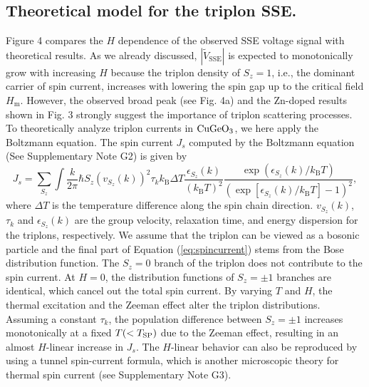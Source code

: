 \documentclass{nature}
\begin{document}
\subsection{Theoretical model for the triplon SSE.}  
Figure 4 compares the $H$ dependence of the observed SSE voltage signal with  theoretical results. 
As we already discussed, $|\tilde{V}_{\mathrm{SSE}}|$ is expected to monotonically grow with increasing $H$ 
because the triplon density of $S_z=1$, i.e., the dominant carrier of spin current, increases with lowering the spin gap 
up to the critical field $H_{\mathrm{m}}$. 
However, the observed broad peak (see Fig. 4a) and the Zn-doped results shown in Fig. 3 strongly suggest 
the importance of triplon scattering processes. 
To theoretically analyze triplon currents in $\rm CuGeO_3$, 
we here apply the Boltzmann equation\cite{abrikosov2017fundamentals}.
The spin current $J_s$ computed by the Boltzmann equation (See Supplementary Note G2) 
is given by
\begin{equation}
	J_s  = \sum _{S_z} \int \frac{k}{2\pi} \hbar S_z (v_{S_z}(k))^2\tau_k k_{\mathrm{B}}\Delta T\frac{\epsilon_{S_z}(k)}{(k_{\mathrm{B}} T)^2} \frac{\exp(\epsilon_{S_z}(k)/k_{\mathrm{B}}T)}{(\exp\left[\epsilon_{S_z}(k)/k_{\mathrm{B}}T\right]- 1)^2},
\label{eq:spincurrent}
\end{equation}
where $\Delta T$ is the temperature difference along the spin chain direction. 
$v_{S_z}(k)$, $\tau_k$ and $\epsilon_{S_z}(k)$ are the group velocity, relaxation time, and energy dispersion 
for the triplons\cite{Takayoshi:2010fi}, respectively. We assume that the triplon can be viewed as a bosonic particle and 
the final part of Equation (\ref{eq:spincurrent}) stems from the Bose distribution function.
The $S_z = 0$ branch of the triplon does not contribute to the spin current. 
At $H=0$, the distribution functions of $S_z = \pm 1$ branches are identical, which cancel out the total spin current. 
By varying $T$ and $H$, the thermal excitation and the Zeeman effect alter the triplon distributions. 
Assuming a constant $\tau_{k}$, the population difference between $S_z = \pm 1$ increases monotonically 
at a fixed $T (<T_{\rm SP})$ due to the Zeeman effect, resulting in an almost $H$-linear increase in $J_s$. 
The $H$-linear behavior can also be reproduced by using 
a tunnel spin-current formula,\cite{Adachi:2011hh,Hirobe:2016eg,Hirobe:2019cf,Jauho:1994cg} 
which is another microscopic theory for thermal spin current (see Supplementary Note G3). 
\end{document}
